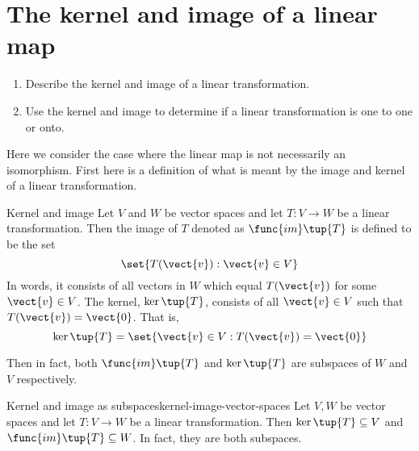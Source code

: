 \section{The kernel and image of a linear map}

\begin{outcome}
  \begin{enumerate}
  \item Describe the kernel and image of a linear transformation.
  \item Use the kernel and image to determine if a linear
    transformation is one to one or onto.
  \end{enumerate}
\end{outcome}

Here we consider the case where the linear map is not necessarily an
isomorphism. First here is a definition of what is meant by the image and
kernel of a linear transformation.

\begin{definition}{Kernel and image}{}
Let $V$ and $W$ be vector spaces and let $T:V\rightarrow W$ be a linear transformation. Then the image of $T$
denoted as $\func{im}\tup{T} $ is defined to be the set 
\begin{equation*}
\set{T(\vect{v}):\vect{v}\in V}
\end{equation*}
In words, it consists of all vectors in $W$ which equal $T(\vect{v})$ for some $
\vect{v}\in V$. The kernel, $\ker \tup{T} $, 
consists of all $\vect{v}\in V$ such that $T(\vect{v})=\vect{0}$. That is, 
\begin{equation*}
\ker \tup{T} =\set{\vect{v}\in V:T(\vect{v})=\vect{0}}
\end{equation*}
\end{definition}

Then in fact, both $\func{im}\tup{T} $ and $\ker \tup{T} $
are subspaces of $W$ and $V$ respectively.

\begin{proposition}{Kernel and image as subspaces}{kernel-image-vector-spaces}
Let $V,W$ be vector spaces and let $T:V\rightarrow W$ be a linear transformation. Then $\ker \tup{
T} \subseteq V$ and $\func{im}\tup{T} \subseteq W$. In fact, they are both subspaces. 
\end{proposition}

